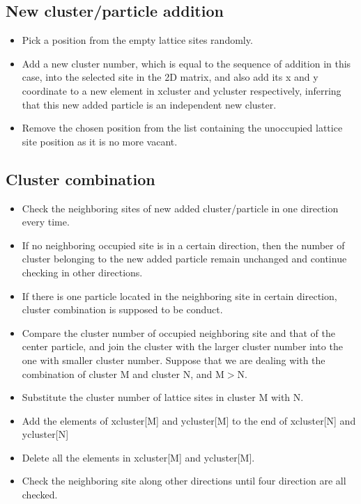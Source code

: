 \documentclass[11pt, oneside]{article}   	%
\begin{document}
\subsection{New cluster/particle addition}
\begin{itemize}
\item Pick a position from the empty lattice sites randomly.
\item Add a new cluster number, which is equal to the sequence of addition in this case, into the selected site in the 2D matrix, and also add its x and y coordinate to a new element in xcluster and ycluster respectively,  inferring that this new added particle is an independent new cluster.
\item Remove the chosen position from the list containing the unoccupied lattice site position as it is no more vacant.
\end{itemize}

\subsection{Cluster combination}
\begin{itemize}
\item Check the neighboring sites of new added cluster/particle in one direction every time.
\item If no neighboring occupied site is in a certain direction, then the number of cluster belonging to the new added particle remain unchanged and continue checking in other directions.
\item If there is one particle located in the neighboring site in certain direction, cluster combination is supposed to be conduct.
\item Compare the cluster number of occupied neighboring site and that of the center particle, and join the cluster with the larger cluster number into the one with smaller cluster number. Suppose that we are dealing with the combination of cluster M and cluster N, and M$>$N.
\item Substitute the cluster number of lattice sites in cluster M with N.  
\item Add the elements of xcluster[M] and ycluster[M] to the end of xcluster[N] and ycluster[N]
\item Delete all the elements in xcluster[M] and ycluster[M].
\item Check the neighboring site along other directions until four direction are all checked.
\end{itemize}
\end{document}
